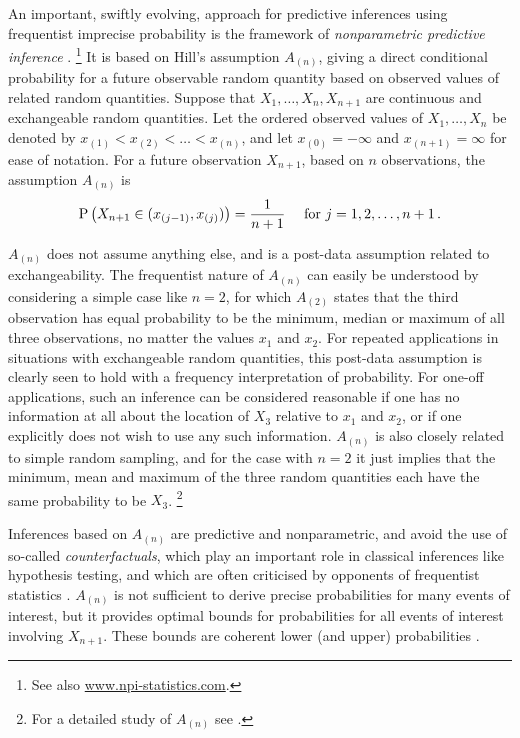 An important, swiftly evolving, approach for predictive inferences using frequentist imprecise probability
is the framework of \emph{nonparametric predictive inference} \parencite[NPI,][]{2004:augustin, 2006b:Coolen}.%
\footnote{See also \url{www.npi-statistics.com}.}
It is based on Hill's \parencite*{1968:hill} assumption $A_{(n)}$,
giving a direct conditional probability for a future observable random quantity
based on observed values of related random quantities.
Suppose that $X_1, \ldots, X_n, X_{n+1}$ are continuous and exchangeable random quantities.
Let the ordered observed values of $X_1, \ldots, X_n$ be denoted by $x_{(1)} < x_{(2)} < \ldots < x_{(n)}$,
and let $x_{(0)}=-\infty$ and $x_{(n+1)}=\infty$ for ease of notation.
For a future observation $X_{n+1}$, based on $n$ observations, the assumption $A_{(n)}$ \parencite{1968:hill} is
\begin{align*}
\operatorname{P}\big(X_{n+1} \in (x_{(j-1)},x_{(j)})\big) = \frac{1}{n+1} \quad \text{ for } j=1,2,\ldots,n+1\,.
\end{align*}

$A_{(n)}$ does not assume anything else, and is a post-data assumption related to exchangeability.
The frequentist nature of $A_{(n)}$ can easily be understood by considering a simple case like $n=2$,
for which $A_{(2)}$ states that the third observation has equal probability
to be the minimum, median or maximum of all three observations, no matter the values $x_1$ and $x_2$.
For repeated applications in situations with exchangeable random quantities,
this post-data assumption is clearly seen to hold with a frequency interpretation of probability.
For one-off applications, such an inference can be considered reasonable
if one has no information at all about the location of $X_3$ relative to $x_1$ and $x_2$,
or if one explicitly does not wish to use any such information.
$A_{(n)}$ is also closely related to simple random sampling,
and for the case with $n=2$ it just implies that the minimum, mean and maximum of the three random quantities
each have the same probability to be $X_3$.%
\footnote{For a detailed study of $A_{(n)}$ see \textcite{1988:hill}.}

Inferences based on $A_{(n)}$ are predictive and nonparametric,
and avoid the use of so-called \emph{counterfactuals},
which play an important role in classical inferences like hypothesis testing,
and which are often criticised by opponents of frequentist statistics
\parencite[see, e.g.,][]{2000:dawid}.
$A_{(n)}$ is not sufficient to derive precise probabilities for many events of interest,
but it provides optimal bounds for probabilities for all events of interest involving $X_{n+1}$.
These bounds are coherent lower (and upper) probabilities \parencite{2004:augustin}.


